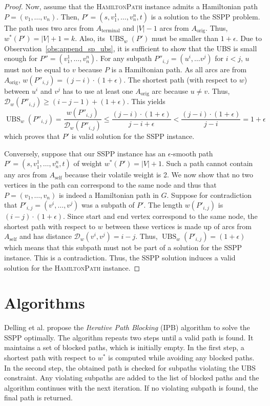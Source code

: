 \documentclass[a4paper,UKenglish,cleveref, autoref, thm-restate]{lipics-v2021}
\newcommand*{\dist}{\mathcal{D}}
\newcommand*{\ubs}{\operatorname{UBS}}
\begin{document}
\begin{proof}
Now, assume that the \textsc{HamiltonPath} instance admits a Hamiltonian path $P = (v_1, \dots, v_n)$.
Then, $P' = (s, v_1^1, \dots, v_n^n, t)$ is a solution to the SSPP problem.
The path uses two arcs from $A_{\operatorname{terminal}}$ and $|V|-1$ arcs from $A_{\operatorname{orig}}$.
Thus, $w^{*}(P') = |V| + 1 = k$.
Also, its $\ubs_w(P')$ must be smaller than $1+\epsilon$.
Due to Observation~\ref{obs:append_sp_ubs}, it is sufficient to show that the UBS is small enough for $P'' = (v_1^1, \dots, v_n^n)$.
For any subpath $P''_{i,j} = (u^i, \dots v^j)$ for $i < j$, $u$ must not be equal to $v$ because $P$ is a Hamiltonian path.
As all arcs are from $A_{\operatorname{orig}}$, $w(P''_{i,j}) = (j-i) \cdot (1+\epsilon)$.
The shortest path (with respect to $w$) between $u^i$ and $v^j$ has to use at least one $A_{\operatorname{orig}}$ arc because $u \neq v$.
Thus, $\dist_w(P''_{i,j}) \geq (i - j - 1) + (1 + \epsilon)$.
This yields
\[
\ubs_w(P''_{i,j}) = \frac{w(P''_{i,j})}{\dist_w(P''_{i,j})} \leq \frac{(j-i) \cdot (1+\epsilon)}{j-i+\epsilon} < \frac{(j-i) \cdot (1+\epsilon)}{j-i} = 1 + \epsilon
\]
which proves that $P'$ is valid solution for the SSPP instance.

Conversely, suppose that our SSPP instance has an $\epsilon$-smooth path $P' = (s, v_1^1, \dots, v_n^n, t)$ of weight $w^*(P') = |V|+1$.
Such a path cannot contain any arcs from $A_{\operatorname{self}}$ because their volatile weight is 2.
We now show that no two vertices in the path can correspond to the same node and thus that $P = (v_1, \dots, v_n)$ is indeed a Hamiltonian path in $G$.
Suppose for contradiction that $P'_{i,j} = (v^i, \dots, v^j)$ was a subpath of $P'$.
The length $w(P'_{i,j})$ is $(i-j) \cdot (1+\epsilon)$.
Since start and end vertex correspond to the same node, the shortest path with respect to $w$ between these vertices is made up of arcs from $A_{\operatorname{self}}$ and has distance $\dist_w(v^i, v^j) = i-j$.
Thus, $\ubs_w(P'_{i,j}) = (1+\epsilon)$ which means that this subpath must not be part of a solution for the SSPP instance.
This is a contradiction.
Thus, the SSPP solution induces a valid solution for the \textsc{HamiltonPath} instance.
\end{proof}

\section{Algorithms}\label{sec:algos}

Delling et al. propose the \emph{Iterative Path Blocking} (IPB) algorithm to solve the SSPP optimally.
The algorithm repeats two steps until a valid path is found.
It maintains a set of blocked paths, which is initially empty.
In the first step, a shortest path with respect to $w^*$ is computed while avoiding any blocked paths.
In the second step, the obtained path is checked for subpaths violating the UBS constraint.
Any violating subpaths are added to the list of blocked paths and the algorithm continues with the next iteration.
If no violating subpath is found, the final path is returned.
\end{document}
